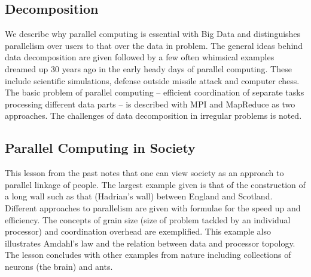 
\subsection{Decomposition}\label{decomposition}

We describe why parallel computing is essential with Big Data and
distinguishes parallelism over users to that over the data in problem.
The general ideas behind data decomposition are given followed by a few
often whimsical examples dreamed up 30 years ago in the early heady days
of parallel computing. These include scientific simulations, defense
outside missile attack and computer chess. The basic problem of parallel
computing -- efficient coordination of separate tasks processing
different data parts -- is described with MPI and MapReduce as two
approaches. The challenges of data decomposition in irregular problems
is noted.




\subsection{Parallel Computing in Society}

This lesson from the past notes that one can view society as an approach
to parallel linkage of people. The largest example given is that of the
construction of a long wall such as that (Hadrian's wall) between
England and Scotland. Different approaches to parallelism are given with
formulae for the speed up and efficiency. The concepts of grain size
(size of problem tackled by an individual processor) and coordination
overhead are exemplified. This example also illustrates Amdahl's law and
the relation between data and processor topology. The lesson concludes
with other examples from nature including collections of neurons (the
brain) and ants.


